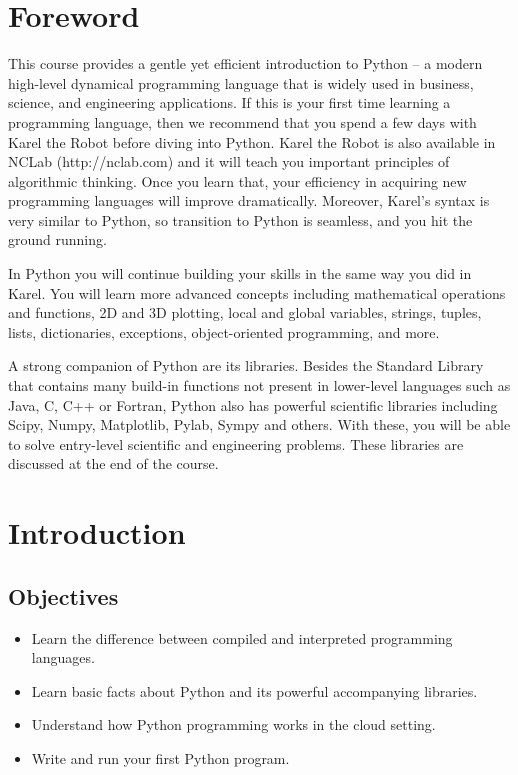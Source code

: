 \documentclass[article,A4,12pt]{llncs}
\begin{document}
\newpage

\pagestyle{plain}
\setcounter{page}{1}

\pagestyle{plain}
\setcounter{page}{1}
\section*{Foreword}
This course provides a gentle yet efficient introduction to Python -- 
a modern high-level dynamical programming language that is widely used in business, 
science, and engineering applications. If this is your first time learning 
a programming language, then we recommend that you spend a few days with 
Karel the Robot before diving into Python. Karel the Robot is also available 
in NCLab (http://nclab.com) and it will teach you important principles of algorithmic 
thinking. Once you learn that, your efficiency in acquiring new programming languages 
will improve dramatically. Moreover, Karel's syntax is very similar to Python, 
so transition to Python is seamless, and you hit the ground running.

In Python you will continue building your skills in the same way you did in Karel. 
You will learn more advanced concepts including mathematical operations and functions, 
2D and 3D plotting, local and global variables, strings, tuples, lists, dictionaries, 
exceptions, object-oriented programming, and more. 

A strong companion of Python are its libraries. Besides the Standard Library that
contains many build-in functions not present in lower-level languages such as 
Java, C, C++ or Fortran, Python also has powerful scientific libraries including 
Scipy, Numpy, Matplotlib, Pylab, Sympy and others. With these, you will be able to 
solve entry-level scientific and engineering problems. These libraries are discussed
at the end of the course.  

\setcounter{section}{0}
\section{Introduction}

\subsection{Objectives}

\begin{itemize}
\item Learn the difference between compiled and interpreted programming languages.
\item Learn basic facts about Python and its powerful accompanying libraries.
\item Understand how Python programming works in the cloud setting.
\item Write and run your first Python program.
\end{itemize}
\end{document}
